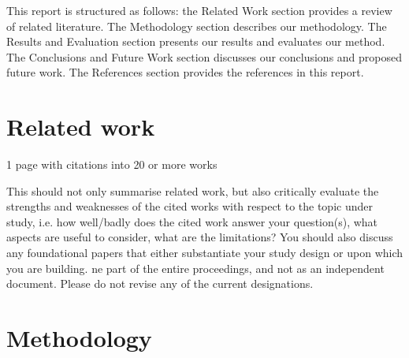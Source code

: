 \documentclass[conference]{IEEEtran}
\begin{document}
This report is structured as follows: the Related Work section provides a review of related literature. The Methodology section describes our methodology. The Results and Evaluation section presents our results and evaluates our method. The Conclusions and Future Work section discusses our conclusions and proposed future work. The References section provides the references in this report.  

\section{Related work}
1 page with citations into 20 or more works  

This should not only summarise related work, but also critically evaluate the strengths and weaknesses of the cited works with respect to the topic under study, i.e. how well/badly does the cited work answer your question(s), what aspects are useful to consider, what are the limitations? You should also discuss any foundational papers that either substantiate your study design or upon which you are building. ne part of the entire proceedings, and not as an independent document. Please do not revise any of the current designations. 

\section{Methodology }
\end{document}
